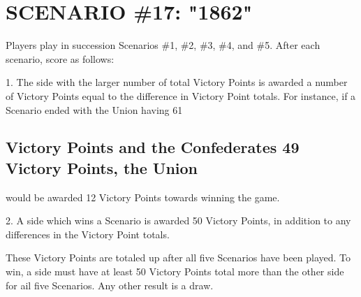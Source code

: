 \section{SCENARIO \#17: "1862"
}


Players play in succession Scenarios \#1, \#2, \#3, \#4, and \#5. After each scenario, score as follows:

1. The side with the larger number of total Victory Points is awarded a number of Victory Points equal to the difference in Victory Point totals. For instance, if a Scenario ended with the Union having 61

\subsection*{Victory Points and the Confederates 49 Victory Points, the Union}

would be awarded 12 Victory Points towards winning the game.

2. A side which wins a Scenario is awarded 50 Victory Points, in addition to any differences in the Victory Point totals.

These Victory Points are totaled up after all five Scenarios have been played. To win, a side must have at least 50 Victory Points total more than the other side for ail five Scenarios. Any other result is a draw.

